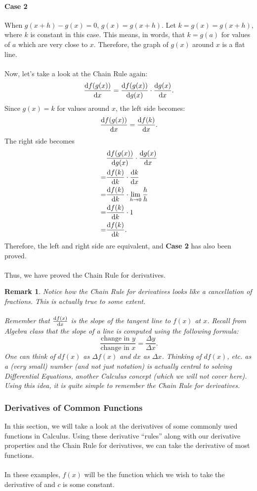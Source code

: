 \documentclass{article}
\newtheorem*{remark}{Remark}
\begin{document}
\paragraph{Case 2} When $g(x+h)-g(x)=0$, $g(x)=g(x+h)$. Let $k=g(x)=g(x+h)$, where $k$ is constant in this case. This means, in words, that $k=g(a)$ for values of $a$ which are very close to $x$. Therefore, the graph of $g(x)$ around $x$ is a flat line. 
\\
\\
Now, let's take a look at the Chain Rule again:
\[\diff{f(g(x))}{x}=\diff{f(g(x))}{g(x)}\cdot \diff{g(x)}{x}.\]
Since $g(x)=k$ for values around $x$, the left side becomes:
\[\diff{f(g(x))}{x}=\diff{f(k)}{x}.\]
The right side becomes
\begin{align*}
    &\diff{f(g(x))}{g(x)}\cdot \diff{g(x)}{x}\\
    =&\diff{f(k)}{k}\cdot \diff{k}{x}\\
    =&\diff{f(k)}{k}\cdot \lim_{h\to 0}\frac{h}{h}\\
    =&\diff{f(k)}{k}\cdot 1\\
    =&\diff{f(k)}{k}.
\end{align*}
Therefore, the left and right side are equivalent, and \textbf{Case 2} has also been proved. 
\\
\\
Thus, we have proved the Chain Rule for derivatives. $\boxed{}$

\begin{remark}
Notice how the Chain Rule for derivatives looks like a cancellation of fractions. This is actually true to some extent. 
\\
\\
Remember that $\diff{f(x)}{x}$ is the slope of the tangent line to $f(x)$ at $x$. Recall from Algebra class that the slope of a line is computed using the following formula:
\[\frac{\text{change in $y$}}{\text{change in $x$}}=\frac{\Delta y}{\Delta x}.\]
One can think of $df(x)$ as $\Delta f(x)$ and $dx$ as $\Delta x$. Thinking of $df(x)$, etc. as a (very small) number (and not just notation) is actually central to solving Differential Equations, another Calculus concept (which we will not cover here). Using this idea, it is quite simple to remember the Chain Rule for derivatives.
\end{remark}

\subsubsection{Derivatives of Common Functions}
In this section, we will take a look at the derivatives of some commonly used functions in Calculus. Using these derivative ``rules'' along with our derivative properties and the Chain Rule for derivatives, we can take the derivative of most functions.
\\
\\
In these examples, $f(x)$ will be the function which we wish to take the derivative of and $c$ is some constant.
\end{document}
